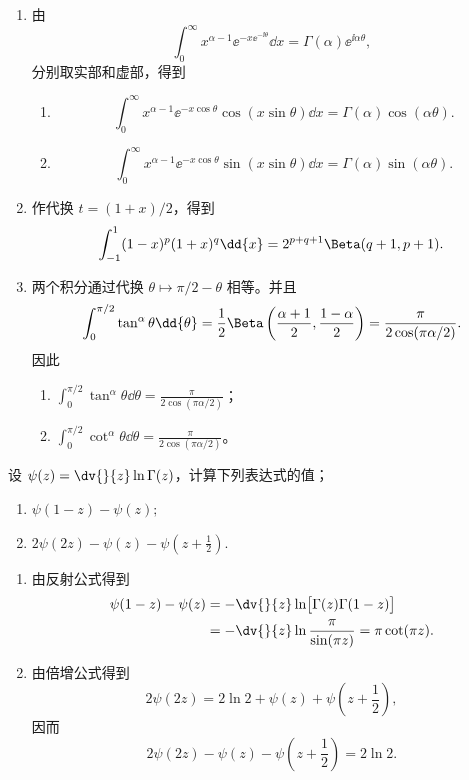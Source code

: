 \begin{question}
\begin{solution}
\begin{enumerate}
  \item 由
  \[
  \int_0^\infty x^{\alpha-1}\ee^{-x\ee^{-\ii\theta}}\dd{x}
  =\Gamma(\alpha)\ee^{\ii\alpha\theta},
  \]
  分别取实部和虚部，得到
  \begin{enumerate}
    \item
    \[
    \int_0^\infty x^{\alpha-1}\ee^{-x\cos\theta}
    \cos(x\sin\theta)\dd{x}
    =\Gamma(\alpha)\cos(\alpha\theta).
    \]
    \item
    \[
    \int_0^\infty x^{\alpha-1}\ee^{-x\cos\theta}
    \sin(x\sin\theta)\dd{x}
    =\Gamma(\alpha)\sin(\alpha\theta).
    \]
  \end{enumerate}

  \item 作代换 \(t=(1+x)/2\)，得到
  \[
  \int_{-1}^{1}(1-x)^p(1+x)^q\dd{x}
  =2^{p+q+1}\Beta(q+1,p+1).
  \]

  \item 两个积分通过代换 \(\theta\mapsto\pi/2-\theta\) 相等。并且
  \[
  \int_0^{\pi/2}\tan^\alpha\theta\dd{\theta}
  =\frac12\Beta\left(\frac{\alpha+1}{2},\frac{1-\alpha}{2}\right)
  =\frac{\pi}{2\cos(\pi\alpha/2)}.
  \]
  因此
  \begin{enumerate}
    \item
    \(\displaystyle\int_0^{\pi/2}\tan^\alpha\theta\dd{\theta}
    =\frac{\pi}{2\cos(\pi\alpha/2)}\)；
    \item
    \(\displaystyle\int_0^{\pi/2}\cot^\alpha\theta\dd{\theta}
    =\frac{\pi}{2\cos(\pi\alpha/2)}\)。
  \end{enumerate}
\end{enumerate}
\end{solution}
\end{question}

\begin{question}
设 \(\psi(z)= \dv{}{z}\ln\Gamma(z)\)，计算下列表达式的值；
\begin{enumerate}
  \item \(\psi(1-z)-\psi(z);\)
  \item \(2\psi(2z)-\psi(z)-\psi(z+\frac12).\)
\end{enumerate}
\begin{solution}
\begin{enumerate}
  \item 由反射公式得到
  \[
  \begin{aligned}
  \psi(1-z)-\psi(z)
  &=-\dv{}{z}\ln\bigl[\Gamma(z)\Gamma(1-z)\bigr]\\
  &=-\dv{}{z}\ln\frac{\pi}{\sin(\pi z)}
  =\pi\cot(\pi z).
  \end{aligned}
  \]

  \item 由倍增公式得到
  \[
  2\psi(2z)
  =2\ln2+\psi(z)+\psi\left(z+\frac12\right),
  \]
  因而
  \[
  2\psi(2z)-\psi(z)-\psi\left(z+\frac12\right)=2\ln2.
  \]
\end{enumerate}
\end{solution}
\end{question}

